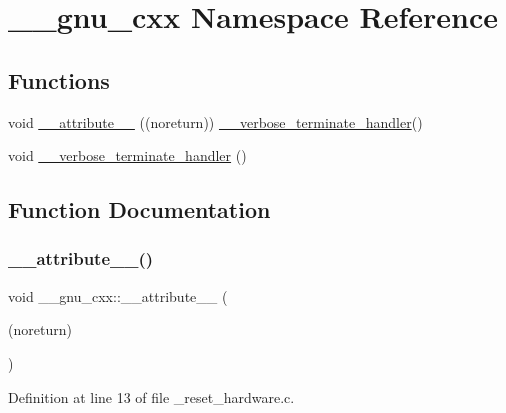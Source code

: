 \hypertarget{namespace____gnu__cxx}{}\section{\+\_\+\+\_\+gnu\+\_\+cxx Namespace Reference}
\label{namespace____gnu__cxx}
\subsection*{Functions}
\begin{DoxyCompactItemize}
\item 
void \hyperlink{namespace____gnu__cxx_acf548952d6d5eb7ed0583d1abedb4164}{\+\_\+\+\_\+attribute\+\_\+\+\_\+} ((noreturn)) \hyperlink{namespace____gnu__cxx_af51888cedbc669a114cd79e39e0cd9be}{\+\_\+\+\_\+verbose\+\_\+terminate\+\_\+handler}()
\item 
void \hyperlink{namespace____gnu__cxx_af51888cedbc669a114cd79e39e0cd9be}{\+\_\+\+\_\+verbose\+\_\+terminate\+\_\+handler} ()
\end{DoxyCompactItemize}


\subsection{Function Documentation}
\mbox{\label{namespace____gnu__cxx_acf548952d6d5eb7ed0583d1abedb4164}} 
\subsubsection{\texorpdfstring{\+\_\+\+\_\+attribute\+\_\+\+\_\+()}{\_\_attribute\_\_()}}
{\footnotesize\ttfamily void \+\_\+\+\_\+gnu\+\_\+cxx\+::\+\_\+\+\_\+attribute\+\_\+\+\_\+ (\begin{DoxyParamCaption}\item[{(noreturn)}]{ }\end{DoxyParamCaption})}



Definition at line 13 of file \+\_\+reset\+\_\+hardware.\+c.

